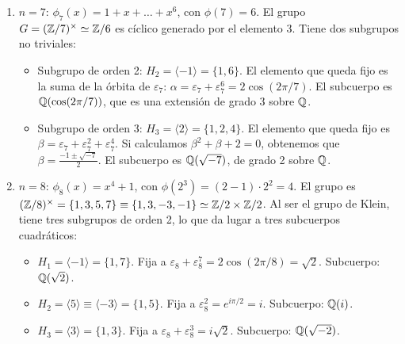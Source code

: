 \begin{enumerate}
\begin{dem}
\begin{enumerate}
        \item \textbf{$n=7$}:
        $\phi_7(x) = 1+x+\dots+x^6$, con $\phi(7)=6$. 
        El grupo $G = (\mathbb{Z}/7)^{\times} \simeq \mathbb{Z}/6$ es cíclico generado por el elemento 3. Tiene dos subgrupos no triviales:
        \begin{itemize}
            \item Subgrupo de orden 2: $H_2 = \langle -1 \rangle = \{1, 6\}$. El elemento que queda fijo es la suma de la órbita de $\varepsilon_7$: $\alpha = \varepsilon_7 + \varepsilon_7^6 = 2\cos(2\pi/7)$. El subcuerpo es $\mathbb{Q}(\cos(2\pi/7))$, que es una extensión de grado 3 sobre $\mathbb{Q}$.
            \item Subgrupo de orden 3: $H_3 = \langle 2 \rangle = \{1, 2, 4\}$. El elemento que queda fijo es $\beta = \varepsilon_7 + \varepsilon_7^2 + \varepsilon_7^4$. Si calculamos $\beta^2+\beta+2=0$, obtenemos que $\beta = \frac{-1 \pm \sqrt{-7}}{2}$. El subcuerpo es $\mathbb{Q}(\sqrt{-7})$, de grado 2 sobre $\mathbb{Q}$.
        \end{itemize}

        \item \textbf{$n=8$}:
        $\phi_8(x) = x^4+1$, con $\phi(2^3) = (2-1)\cdot 2^2 = 4$. 
        El grupo es $(\mathbb{Z}/8)^{\times}=\{1,3,5,7\} \equiv \{1,3,-3,-1\} \simeq \mathbb{Z}/2\times \mathbb{Z}/2$. Al ser el grupo de Klein, tiene tres subgrupos de orden 2, lo que da lugar a tres subcuerpos cuadráticos:
        \begin{itemize}
            \item $H_1 = \langle -1 \rangle = \{1, 7\}$. Fija a $\varepsilon_8 + \varepsilon_8^7 = 2\cos(2\pi/8) = \sqrt{2}$. Subcuerpo: $\mathbb{Q}(\sqrt{2})$.
            \item $H_2 = \langle 5 \rangle \equiv \langle -3 \rangle = \{1, 5\}$. Fija a $\varepsilon_8^2 = e^{i\pi/2} = i$. Subcuerpo: $\mathbb{Q}(i)$.
            \item $H_3 = \langle 3 \rangle = \{1, 3\}$. Fija a $\varepsilon_8 + \varepsilon_8^3 = i\sqrt{2}$. Subcuerpo: $\mathbb{Q}(\sqrt{-2})$.
        \end{itemize}


\end{enumerate}
\end{dem}
\end{enumerate}
